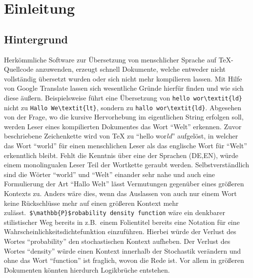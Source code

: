 \section{Einleitung}
\subsection{Hintergrund}\label{einleitung:hintergrund}
Herkömmliche Software zur Übersetzung von menschlicher Sprache auf \TeX{}-Quellcode anzuwenden, erzeugt schnell Dokumente, welche entweder nicht vollständig übersetzt wurden oder sich nicht mehr kompilieren lassen. Mit Hilfe von Google Translate lassen sich wesentliche Gründe hierfür finden und wie sich diese äußern. Beispielsweise führt eine Übersetzung von \verb|hello wor\textit{ld}| nicht zu \verb|Hallo We\textit{lt}|, sondern zu \verb|hallo wor\textit{ld}|. Abgesehen von der Frage, wo die kursive Hervorhebung im eigentlichen String erfolgen soll, werden Leser eines kompilierten Dokumentes das Wort \enquote{Welt} erkennen. Zuvor beschriebene Zeichenkette wird von \TeX{} zu \enquote{hello wor\textit{ld}} aufgelöst, in welcher das Wort \enquote{world} für einen menschlichen Leser als das englische Wort für \enquote{Welt} erkenntlich bleibt. Fehlt die Kenntnis über eine der Sprachen (DE,EN), würde einem monolingualen Leser Teil der Wortkette geraubt werden. Selbstverständlich sind die Wörter \enquote{world} und \enquote{Welt} einander sehr nahe und auch eine Formulierung der Art \enquote{Hallo Welt} lässt Vermutungen gegenüber eines größeren Kontexts zu.%
Anders wäre dies, wenn das Auslassen von auch nur einem Wort keine Rückschlüsse mehr auf einen größeren Kontext mehr zulässt.\ \verb|$\mathbb{P}$robability density function| wäre ein denkbarer stilistischer Weg bereits in z.B.\ einem Folientitel bereits eine Notation für eine Wahrscheinlichkeitsdichtefunktion einzuführen. Hierbei würde der Verlust des Wortes \enquote{probability} den stochastischen Kontext aufheben. Der Verlust des Wortes \enquote{density} würde einen Kontext innerhalb der Stochastik verändern und ohne das Wort \enquote{function} ist fraglich, wovon die Rede ist. Vor allem in größeren Dokumenten könnten hierdurch Logikbrüche entstehen.%
\\\noindent


